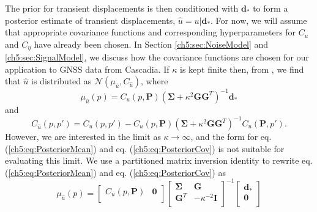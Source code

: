 The prior for transient displacements is then conditioned with $\mathbf{d}_*$ to form a posterior estimate of transient displacements, $\hat{u} = u | \mathbf{d}_*$. For now, we will assume that appropriate covariance functions and corresponding hyperparameters for $C_u$ and $C_\eta$ have already been chosen. In Section \ref{ch5:sec:NoiseModel} and \ref{ch5:sec:SignalModel}, we discuss how the covariance functions are chosen for our application to GNSS data from Cascadia. If $\kappa$ is kept finite then, from \citet[sec. 2.2]{Rasmussen2006}, we find that $\hat{u}$ is distributed as $\mathcal{N}(\mu_{\hat{u}},C_{\hat{u}})$, where
\begin{equation}\label{ch5:eq:PosteriorMean}
\mu_{\hat{u}}(p) = C_u(p,\mathbf{P})\left(\mathbf{\Sigma} + \kappa^2\mathbf{G}\mathbf{G}^T\right)^{-1}\mathbf{d}_*
\end{equation}    
and
\begin{equation}\label{ch5:eq:PosteriorCov}
C_{\hat{u}}(p,p') = C_u(p,p') - C_u(p,\mathbf{P})\left(\mathbf{\Sigma} + \kappa^2\mathbf{G}\mathbf{G}^T\right)^{-1}C_u(\mathbf{P},p').
\end{equation}
However, we are interested in the limit as $\kappa \to \infty$, and the form for eq. (\ref{ch5:eq:PosteriorMean}) and eq. (\ref{ch5:eq:PosteriorCov}) is not suitable for evaluating this limit. We use a partitioned matrix inversion identity \citep[sec. 2.7.4]{Press2007} to rewrite eq. (\ref{ch5:eq:PosteriorMean}) and eq. (\ref{ch5:eq:PosteriorCov}) as
 \begin{equation}\label{ch5:eq:PosteriorMean2}
\mu_{\hat{u}}(p) = \left[\begin{array}{cc}
                         C_u(p,\mathbf{P}) & \mathbf{0} \\
                         \end{array}\right]
                   \left[\begin{array}{cc}
                         \mathbf{\Sigma} & \mathbf{G} \\
                         \mathbf{G}^T  & -\kappa^{-2} \mathbf{I} \\
                         \end{array}\right]^{-1}
                   \left[\begin{array}{c}
                         \mathbf{d}_* \\
                         \mathbf{0} \\
                         \end{array}\right]
\end{equation}    

